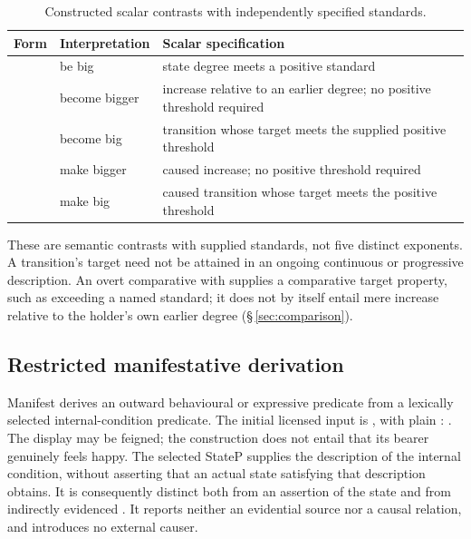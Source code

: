 \begin{table}[htbp]
\footnotesize
\caption{Constructed scalar contrasts with independently specified standards.}
\label{tab:stative-scalar-contrasts}
\begin{tabularx}{\textwidth}{l L L}
\toprule
Form & Interpretation & Scalar specification \\
\midrule
{} & be big & state degree meets a positive standard \\
 & become bigger & increase relative to an earlier degree; no positive threshold required \\
 & become big & transition whose target meets the supplied positive threshold \\
 & make bigger & caused increase; no positive threshold required \\
 & make big & caused transition whose target meets the positive threshold \\
\bottomrule
\end{tabularx}
\end{table}

These are semantic contrasts with supplied standards, not five distinct
exponents. A transition's target need not be attained in an ongoing
continuous or progressive description. An overt comparative with
 supplies a comparative target property, such as exceeding a
named standard; it does not by itself entail mere increase relative to the
holder's own earlier degree (§\,\ref{sec:comparison}).

\subsection{Restricted manifestative derivation}\label{sec:stative-manifest}

Manifest derives an outward behavioural or expressive predicate from a
lexically selected internal-condition predicate. The initial licensed input
is  , with plain :
 . The display may be feigned;
the construction does not entail that its bearer genuinely feels happy.
The selected StateP supplies the description of the internal condition,
without asserting that an actual state satisfying that description obtains.
It is consequently distinct both from an assertion of the state and from
indirectly evidenced . It reports neither an evidential
source nor a causal relation, and introduces no external causer.

